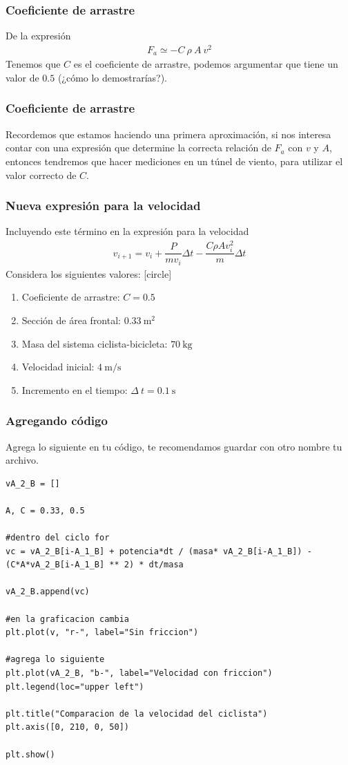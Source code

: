 \begin{frame}
\frametitle{Coeficiente de arrastre}
De la expresión
\begin{align*}
F_{a} \simeq - C \: \rho \: A \: v^{2}
\end{align*}
Tenemos que $C$ es el coeficiente de arrastre, podemos argumentar que tiene un valor de $0.5$ (¿cómo lo demostrarías?).
\end{frame}
\begin{frame}
\frametitle{Coeficiente de arrastre}
Recordemos que estamos haciendo una primera aproximación, si nos interesa contar con una expresión que determine la correcta relación de $F_{a}$ con $v$ y $A$, entonces tendremos que hacer mediciones en un túnel de viento, para utilizar el valor correcto de $C$.
\end{frame}
\begin{frame}
\frametitle{Nueva expresión para la velocidad}
Incluyendo este término en la expresión para la velocidad
\begin{align}
v_{i+1} = v_{i} + \dfrac{P}{m v_{i}} \Delta t - \dfrac{C \rho A v_{i}^{2}}{m} \Delta t
\label{Eqvelifriccion}
\end{align}
Considera los siguientes valores:
[circle]
\begin{enumerate}[<+->]
\item Coeficiente de arrastre: $C = 0.5$
\item Sección de área frontal: $0.33 \: \si{\square\meter}$
\item Masa del sistema ciclista-bicicleta: $70 \: \si{\kilogram}$
\item Velocidad inicial: $4 \: \si{\meter\per\second}$
\item Incremento en el tiempo: $\Delta \: t = 0.1 \: \si{\second}$
\end{enumerate}
\end{frame}
\begin{frame}
\frametitle{Agregando código}
Agrega lo siguiente en tu código, te recomendamos guardar con otro nombre tu archivo.
\begin{lstlisting}[style=codigopython]
vA_2_B = []

A, C = 0.33, 0.5

#dentro del ciclo for
vc = vA_2_B[i-A_1_B] + potencia*dt / (masa* vA_2_B[i-A_1_B]) - (C*A*vA_2_B[i-A_1_B] ** 2) * dt/masa
    
vA_2_B.append(vc)

#en la graficacion cambia
plt.plot(v, "r-", label="Sin friccion")

#agrega lo siguiente
plt.plot(vA_2_B, "b-", label="Velocidad con friccion")
plt.legend(loc="upper left")

plt.title("Comparacion de la velocidad del ciclista")
plt.axis([0, 210, 0, 50])

plt.show()
\end{lstlisting}
\end{frame}
